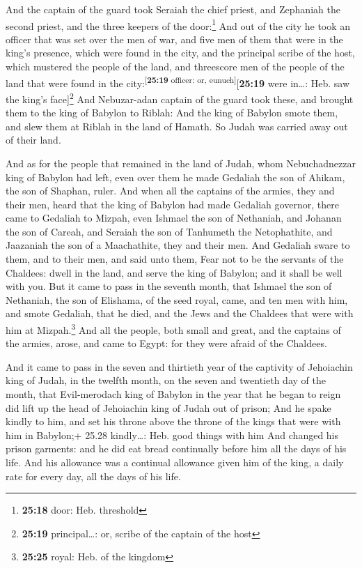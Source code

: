  And the captain of the guard took Seraiah the chief
priest, and Zephaniah the second priest, and the three keepers of the
door:\footnote{\textbf{25:18} door: Heb. threshold}  And
out of the city he took an officer that was set over the men of war, and
five men of them that were in the king's presence, which were found in
the city, and the principal scribe of the host, which mustered the
people of the land, and threescore men of the people of the land that
were found in the city:\textsuperscript{{[}\textbf{25:19} officer: or,
eunuch{]}}{[}\textbf{25:19} were in\ldots: Heb. saw the king's
face{]}\footnote{\textbf{25:19} principal\ldots: or, scribe of the
  captain of the host}  And Nebuzar-adan captain of the
guard took these, and brought them to the king of Babylon to Riblah:
 And the king of Babylon smote them, and slew them at
Riblah in the land of Hamath. So Judah was carried away out of their
land.

 And as for the people that remained in the land of
Judah, whom Nebuchadnezzar king of Babylon had left, even over them he
made Gedaliah the son of Ahikam, the son of Shaphan, ruler.
 And when all the captains of the armies, they and their
men, heard that the king of Babylon had made Gedaliah governor, there
came to Gedaliah to Mizpah, even Ishmael the son of Nethaniah, and
Johanan the son of Careah, and Seraiah the son of Tanhumeth the
Netophathite, and Jaazaniah the son of a Maachathite, they and their
men.  And Gedaliah sware to them, and to their men, and
said unto them, Fear not to be the servants of the Chaldees: dwell in
the land, and serve the king of Babylon; and it shall be well with you.
 But it came to pass in the seventh month, that Ishmael
the son of Nethaniah, the son of Elishama, of the seed royal, came, and
ten men with him, and smote Gedaliah, that he died, and the Jews and the
Chaldees that were with him at Mizpah.\footnote{\textbf{25:25} royal:
  Heb. of the kingdom}  And all the people, both small
and great, and the captains of the armies, arose, and came to Egypt: for
they were afraid of the Chaldees.

 And it came to pass in the seven and thirtieth year of
the captivity of Jehoiachin king of Judah, in the twelfth month, on the
seven and twentieth day of the month, that Evil-merodach king of Babylon
in the year that he began to reign did lift up the head of Jehoiachin
king of Judah out of prison;  And he spake kindly to him,
and set his throne above the throne of the kings that were with him in
Babylon;+ 25.28 kindly\ldots: Heb. good things with him 
And changed his prison garments: and he did eat bread continually before
him all the days of his life.  And his allowance was a
continual allowance given him of the king, a daily rate for every day,
all the days of his life.
